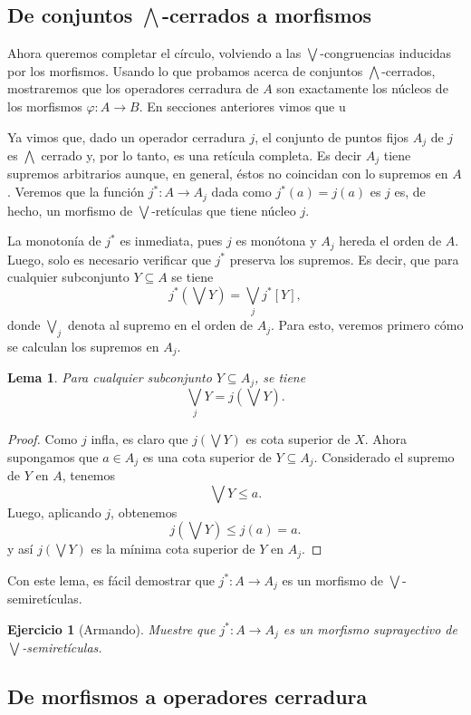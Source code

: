 \documentclass[12pt,letterpaper,titlepage]{article}
\newtheorem{exe}{Ejercicio}
\newtheorem*{lemma}{Lema}
\theoremstyle{definition}
\newcommand\Sup{\bigvee}
\renewcommand\phi{\varphi}
\newcommand\Inf{\bigwedge}
\newcommand\tps[1]{\texorpdfstring{#1}{}}
\newcommand\<{\langle}
\renewcommand\>{\rangle}
\begin{document}
\subsection{De conjuntos \tps{$\Inf$}-cerrados a morfismos}

Ahora queremos completar el círculo, volviendo a las $\Sup$-congruencias
inducidas por los morfismos.
Usando lo que probamos acerca de conjuntos $\Inf$-cerrados,
mostraremos que los operadores cerradura de $A$ son exactamente
los núcleos de los morfismos $\phi:A\to B$.
En secciones anteriores vimos que u

Ya vimos que, dado un operador cerradura $j$, el conjunto de puntos fijos $A_j$
de $j$ es $\Inf$ cerrado y, por lo tanto, es una retícula completa.
Es decir $A_j$ tiene supremos arbitrarios aunque, en general,
éstos no coincidan con lo supremos en $A$.
Veremos que la función $j^*:A\to A_j$ dada como $j^*(a) = j(a)$ es $j$
es, de hecho, un morfismo de $\Sup$-retículas que tiene núcleo $j$.

La monotonía de $j^*$ es inmediata, pues $j$ es monótona y $A_j$ hereda el
orden de $A$.
Luego, solo es necesario verificar que $j^*$ preserva los supremos.
Es decir, que para cualquier subconjunto $Y\subseteq A$ se tiene
\[
    j^*(\Sup Y) = \Sup_j j^*[Y]
,\]
donde $\Sup_j$ denota al supremo en el orden de $A_j$.
Para esto, veremos primero cómo se calculan los supremos en $A_j$.
\begin{lemma}
    Para cualquier subconjunto $Y\subseteq A_j$, se tiene
    \[
        \Sup_j Y = j(\Sup Y)
    .\]
\end{lemma}
\begin{proof}
    Como $j$ infla, es claro que $j(\Sup Y)$ es cota superior de $X$.
    Ahora supongamos que $a\in A_j$ es una cota superior de $Y\subseteq A_j$.
    Considerado el supremo de $Y$ en $A$, tenemos
    \[
        \Sup Y\leq a
    .\]
    Luego, aplicando $j$, obtenemos
    \[
        j(\Sup Y) \leq j(a) = a
    .\]
    y así $j(\Sup Y)$ es la mínima cota superior de $Y$ en $A_j$.
\end{proof}
Con este lema, es fácil demostrar que $j^*:A\to A_j$ es un morfismo de
$\Sup$-semiretículas.
\begin{exe}[Armando]
    Muestre que $j^*:A\to A_j$ es un morfismo suprayectivo de $\Sup$-semiretículas.
\end{exe}

\subsection{De morfismos a operadores cerradura}
\end{document}
